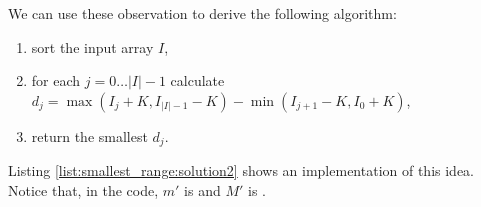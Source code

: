 We can use these observation to derive the following algorithm:
\begin{enumerate}
	\item sort the input array $I$,
	\item for each $j = 0 \ldots |I|-1$ calculate $d_j = \max{(I_j+K,I_{|I|-1}-K)} - \min{(I_{j+1}-K, I_0 +K)}$,
	\item return the smallest $d_j$.
\end{enumerate}
Listing \ref{list:smallest_range:solution2} shows an implementation of this idea.
Notice that, in the code, $m'$ is  and $M'$ is .


